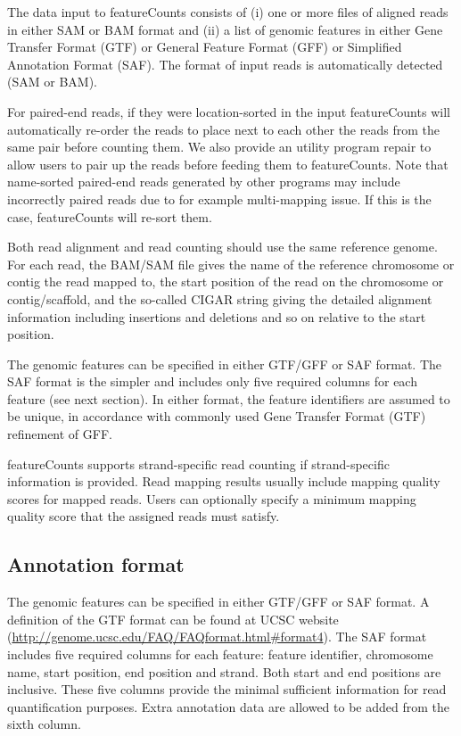 \documentclass[12pt]{report}
\newcommand{\featureCounts}{\textsf{featureCounts}}
\newcommand{\repair}{\textsf{repair}}
\begin{document}
The data input to {\featureCounts} consists of (i) one or more files of aligned reads in either SAM or BAM format and (ii) a list of genomic features in either Gene Transfer Format (GTF) or General Feature Format (GFF) or Simplified Annotation Format (SAF). The format of input reads is automatically detected (SAM or BAM).

For paired-end reads, if they were location-sorted in the input {\featureCounts} will automatically re-order the reads to place next to each other the reads from the same pair before counting them.
We also provide an utility program {\repair} to allow users to pair up the reads before feeding them to {\featureCounts}.
Note that name-sorted paired-end reads generated by other programs may include incorrectly paired reads due to for example multi-mapping issue.
If this is the case, {\featureCounts} will re-sort them.

Both read alignment and read counting should use the same reference genome. For each read, the BAM/SAM file gives the name of the reference chromosome or contig the read mapped to, the start position of the read on the chromosome or contig/scaffold, and the so-called CIGAR string giving the detailed alignment information including insertions and deletions and so on relative to the start position.

The genomic features can be specified in either GTF/GFF or SAF format. The SAF format is the simpler and includes only five required columns for each feature (see next section). In either format, the feature identifiers are assumed to be unique, in accordance with commonly used Gene Transfer Format (GTF) refinement of GFF.

{\featureCounts} supports strand-specific read counting if strand-specific information is provided. Read mapping results usually include mapping quality scores for mapped reads. Users can optionally specify a minimum mapping quality score that the assigned reads must satisfy.

\subsection{Annotation format}
\label{sec:annotation}

The genomic features can be specified in either GTF/GFF or SAF format.
A definition of the GTF format can be found at UCSC website (\url{http://genome.ucsc.edu/FAQ/FAQformat.html#format4}).
The SAF format includes five required columns for each feature: feature identifier, chromosome name, start position, end position and strand.
Both start and end positions are inclusive.
These five columns provide the minimal sufficient information for read quantification purposes.
Extra annotation data are allowed to be added from the sixth column. 
\end{document}
